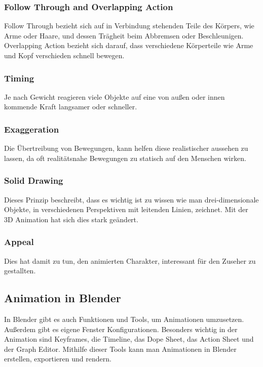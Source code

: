 \subsubsection{Follow Through and Overlapping Action}
Follow Through bezieht sich auf in Verbindung stehenden Teile des Körpers, wie Arme oder Haare,
und dessen Trägheit beim Abbremsen oder Beschleunigen. Overlapping Action bezieht sich darauf, dass verschiedene Körperteile wie Arme und Kopf verschieden schnell bewegen.

\subsubsection{Timing}
Je nach Gewicht reagieren viele Objekte auf eine von außen oder innen kommende Kraft langsamer oder schneller.

\subsubsection{Exaggeration}
Die Übertreibung von Bewegungen, kann helfen diese realistischer aussehen zu lassen, da oft realitätsnahe Bewegungen zu statisch auf den Menschen wirken.

\subsubsection{Solid Drawing}
Dieses Prinzip beschreibt, dass es wichtig ist zu wissen wie man
drei-dimensionale Objekte, in verschiedenen Perspektiven mit leitenden Linien, zeichnet. Mit der 3D Animation hat sich dies stark geändert.

\subsubsection{Appeal}
Dies hat damit zu tun, den animierten Charakter, interessant für den Zuseher zu gestallten.

\subsection{Animation in Blender}
In Blender gibt es auch Funktionen und Tools, um Animationen umzusetzen. Außerdem gibt es eigene Fenster Konfigurationen.
Besonders wichtig in der Animation sind Keyframes, die Timeline, das Dope Sheet,
das Action Sheet und der Graph Editor. Mithilfe dieser Tools kann man Animationen in Blender erstellen, exportieren und rendern.

